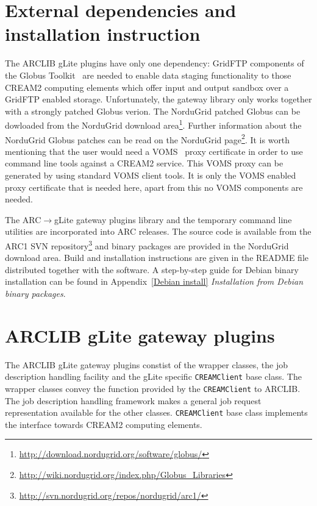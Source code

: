 \documentclass{article}
\begin{document}
\section{External dependencies and installation instruction}
\label{External dependencies and installation instruction}
The ARCLIB gLite plugins have only one dependency: GridFTP components of the Globus Toolkit~\cite{globus} are needed to enable data staging functionality to those CREAM2 computing elements which offer input and output sandbox over a GridFTP enabled storage. Unfortunately, the gateway library only works together with a strongly patched Globus verion. The NorduGrid patched Globus can be dowloaded from the NorduGrid download area\footnote{\url{http://download.nordugrid.org/software/globus/}}. Further information about the NorduGrid Globus patches can be read on the NorduGrid page\footnote{\url{http://wiki.nordugrid.org/index.php/Globus\_Libraries}}. It is worth mentioning that the user would need a VOMS~\cite{voms} proxy certificate in order to use command line tools against a CREAM2 service. This VOMS proxy can be generated by using standard VOMS client tools. It is only the VOMS enabled proxy certificate that is needed here, apart from this no VOMS components are needed.

The ARC$\rightarrow$gLite gateway plugins library and the temporary command line utilities are incorporated into ARC releases. The source code is available from the ARC1 SVN repository\footnote{\url{http://svn.nordugrid.org/repos/nordugrid/arc1/}} and binary packages are provided in the NorduGrid download area. Build and installation instructions are given in the README file distributed together with the software. A step-by-step guide for Debian binary installation can be found in Appendix~\ref{Debian install} \textit{Installation from Debian binary packages}.

\section{ARCLIB gLite gateway plugins}
\label{ARCLIB gLite gateway plugins}
The ARCLIB gLite gateway plugins constist of the wrapper classes, the job description handling facility and the gLite specific \texttt{CREAMClient} base class. The wrapper classes convey the function provided by the \texttt{CREAMClient} to ARCLIB. The job description handling framework makes a general job request representation available for the other classes. \texttt{CREAMClient} base class implements the interface towards CREAM2 computing elements.
\end{document}
